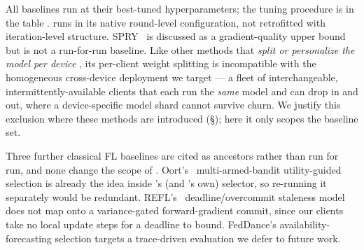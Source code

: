 

All baselines run at their best-tuned hyperparameters; the tuning
procedure is in the table . \fwdllm{}
runs in its native round-level configuration, not retrofitted with
iteration-level structure. SPRY~\cite{panchal2024spry} is discussed as
a gradient-quality upper bound but is not a run-for-run baseline. Like
other methods that \emph{split or personalize the model per device}
, its
per-client weight splitting is incompatible with the homogeneous
cross-device deployment we target --- a fleet of interchangeable,
intermittently-available clients that each run the \emph{same} model
and can drop in and out, where a device-specific model shard cannot
survive churn. We justify this exclusion where these methods are
introduced (\S{}); here it only scopes the
baseline set.

Three further classical FL baselines are cited as ancestors rather
than run for run, and none change the scope of
. Oort's~\cite{oort} multi-armed-bandit
utility-guided selection is already the idea inside \felixp{}'s (and
\sys{}'s own) selector, so re-running it separately would be
redundant. REFL's~\cite{abdelmoniem2023refl} deadline/overcommit
staleness model does not map onto a variance-gated forward-gradient
commit, since our clients take no local update steps for a deadline to
bound. FedDance's availability-forecasting selection targets a
trace-driven evaluation we defer to future work.


